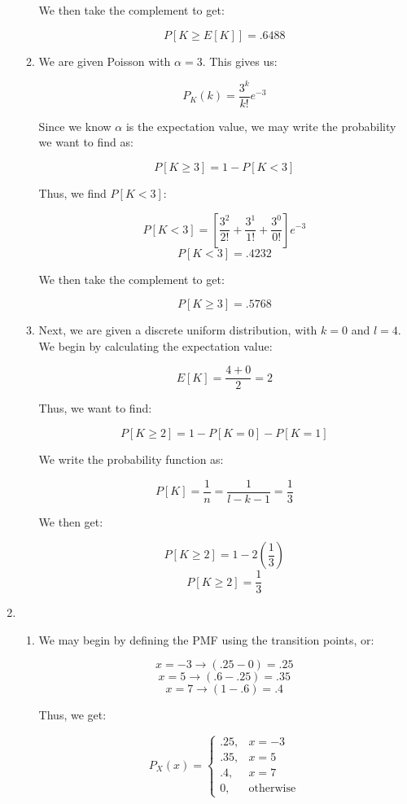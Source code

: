 \begin{enumerate}
\begin{enumerate}
        We then take the complement to get:

        $$\boxed{P[K\geq E[K]]=.6488}$$

      \item We are given Poisson with $\alpha=3$. This gives us:

        $$P_K(k)=\frac{3^k}{k!}e^{-3}$$

        Since we know $\alpha$ is the expectation value, we may write the probability we want to find as:

        $$P[K\geq 3]=1-P[K<3]$$

        Thus, we find $P[K<3]$:

        $$P[K<3]=\left[\frac{3^2}{2!}+\frac{3^1}{1!}+\frac{3^0}{0!}\right]e^{-3}$$
        $$P[K<3]=.4232$$

        We then take the complement to get:

        $$\boxed{P[K\geq 3]=.5768}$$

      \item Next, we are given a discrete uniform distribution, with $k=0$ and $l=4$. We begin by calculating the expectation value:

        $$E[K]=\frac{4+0}{2}=2$$

        Thus, we want to find:

        $$P[K\geq 2]=1-P[K=0]-P[K=1]$$

        We write the probability function as:

        $$P[K]=\frac{1}{n}=\frac{1}{l-k-1}=\frac{1}{3}$$

        We then get:

        $$P[K\geq 2]=1-2\left( \frac{1}{3} \right)$$
        $$\boxed{P[K\geq 2]=\frac{1}{3}}$$

    \end{enumerate}

  \item 

    \begin{enumerate}

      \item We may begin by defining the PMF using the transition points, or:

        $$x=-3\to (.25-0)=.25$$
        $$x=5\to (.6-.25)=.35$$
        $$x=7\to (1-.6)=.4$$

        Thus, we get:

        $$\boxed{P_X(x)=\left\{\begin{array}{ll} .25, & x=-3\\ .35, & x=5\\ .4, & x=7\\ 0, & \text{otherwise} \end{array}}$$


\end{enumerate}
\end{enumerate}
